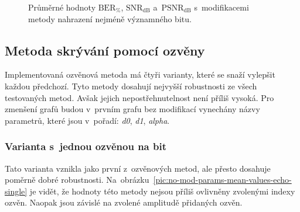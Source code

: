 \begin{figure}[hbt]
    \table
    \centering
    \caption{Průměrné hodnoty $\mathrm{BER}_{\%}$, $\mathrm{SNR}_\mathrm{dB}$
    a~$\mathrm{PSNR}_\mathrm{dB}$ s~modifikacemi metody nahrazení nejméně
    významného bitu.}
    \label{pic:modifications-mean-values-lsb}
\end{figure}

\subsection*{Metoda skrývání pomocí ozvěny}

Implementovaná ozvěnová metoda má čtyři varianty, které se snaží vylepšit
každou předchozí. Tyto metody dosahují nejvyšší robustnosti ze všech
testovaných metod. Avšak jejich nepostřehnutelnost není příliš vysoká. Pro
zmenšení grafů budou v~prvním grafu bez modifikací vynechány názvy parametrů,
které jsou v~pořadí: \textit{d0}, \textit{d1}, \textit{alpha}.

\subsubsection*{Varianta s~jednou ozvěnou na bit}

Tato varianta vznikla jako první z~ozvěnových metod, ale přesto dosahuje
poměrně dobré robustnosti.
Na~obrázku~\ref{pic:no-mod-params-mean-values-echo-single} je vidět, že hodnoty
této metody nejsou příliš ovlivněny zvolenými indexy ozvěn. Naopak jsou závislé
na zvolené amplitudě přidaných ozvěn.

